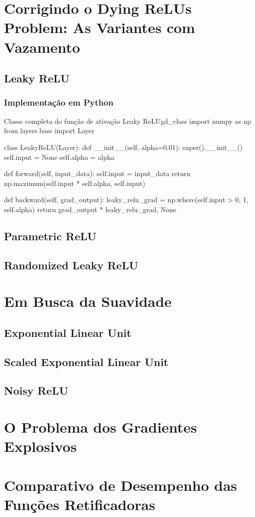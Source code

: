 \section{Corrigindo o Dying ReLUs Problem: As Variantes com Vazamento}

\subsection{Leaky ReLU}

\subsubsection{Implementação em Python}

\begin{codelisting}{Classe completa do função de ativação Leaky ReLU}{gd_class}
import numpy as np
from layers.base import Layer


class LeakyReLU(Layer):
    def __init__(self, alpha=0.01):
        super().__init__()
        self.input = None
        self.alpha = alpha

    def forward(self, input_data):
        self.input = input_data
        return np.maximum(self.input * self.alpha, self.input)

    def backward(self, grad_output):
        leaky_relu_grad = np.where(self.input > 0, 1, self.alpha)
        return grad_output * leaky_relu_grad, None
\end{codelisting}

\subsection{Parametric ReLU}

\subsection{Randomized Leaky ReLU}

\section{Em Busca da Suavidade}

\subsection{Exponential Linear Unit}

\subsection{Scaled Exponential Linear Unit}

\subsection{Noisy ReLU}

\section{O Problema dos Gradientes Explosivos}

\section{Comparativo de Desempenho das Funções Retificadoras}
